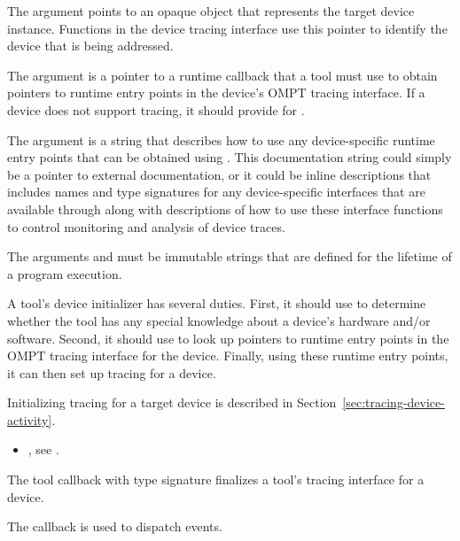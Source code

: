 The  argument points to an opaque object that represents 
the target device instance. Functions in the device tracing interface 
use this pointer to identify the device that is being addressed.

The argument  is a pointer to a runtime callback
that a tool must use to obtain pointers to runtime entry points in the
device's OMPT tracing interface. If a device does not support tracing,
it should provide  for .

The argument  is a string that describes
how to use any device-specific runtime
entry points that can be obtained using . This
documentation string could simply be a pointer to external
documentation, or it could be inline descriptions
that includes names and type signatures for any
device-specific interfaces that are available through 
along with descriptions of how to use these interface functions to
control monitoring and analysis of device traces.

\constraints
The arguments  and  must be
immutable strings that are defined for the lifetime of a program
execution.

\effect
A tool's device initializer has several duties.  First, it should use
 to determine whether the tool has any special knowledge
about a device's hardware and/or software.  Second, it should use
 to look up pointers to runtime entry points in the OMPT tracing
interface for the device.  Finally, using these runtime entry points, it can
then set up tracing for a device.

Initializing tracing for a target device is described in 
Section~\ref{sec:tracing-device-activity}.

\crossreferences
\begin{itemize}
\item {}, see .
\end{itemize}



\label{sec:ompt_callback_device_finalize_t}

\summary The tool callback with type signature
 finalizes a
tool's tracing interface for a device.

The  callback is used to dispatch
 events.


